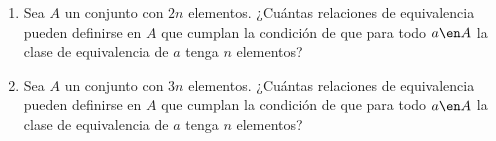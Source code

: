 \begin{enunciado}{\ejercicio}
  \begin{enumerate}[label=\alph*)]
    \item Sea $A$ un conjunto con $2n$ elementos. ¿Cuántas relaciones de equivalencia pueden definirse en $A$ que cumplan la condición
          de que para todo $a \en A$ la clase de equivalencia de $a$ tenga $n$ elementos?

    \item Sea $A$ un conjunto con $3n$ elementos. ¿Cuántas relaciones de equivalencia pueden definirse en $A$ que cumplan la condición
          de que para todo $a \en A$ la clase de equivalencia de $a$ tenga $n$ elementos?

  \end{enumerate}
\end{enunciado}

